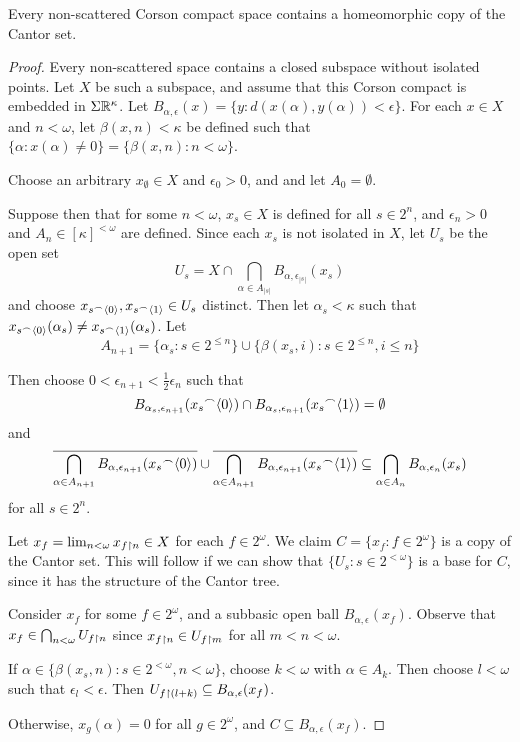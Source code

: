 \documentclass[11pt]{article}
\begin{document}
  \begin{lemma}
    Every non-scattered Corson compact space contains a homeomorphic
    copy of the Cantor set.
  \end{lemma}

  \begin{proof}
    Every non-scattered space contains a closed subspace without
    isolated points. Let $X$ be such a subspace, and assume that this
    Corson compact is embedded in $\Sigma\mathbb{R}^{\kappa}$. Let
    $B_{\alpha,\epsilon}(x)=\{y: d(x(\alpha),y(\alpha))<\epsilon\}$.
    For each $x\in X$ and $n<\omega$, let $\beta(x,n)<\kappa$ be defined
    such that
    $\{\alpha:x(\alpha)\not=0\}=\{\beta(x,n):n<\omega\}$.

    Choose an arbitrary $x_\emptyset\in X$ and $\epsilon_0>0$, and
    and let $A_0=\emptyset$.

    Suppose then that for some $n<\omega$,
    $x_s\in X$ is defined for all $s\in 2^n$,
    and $\epsilon_n>0$ and $A_n\in[\kappa]^{<\omega}$ are defined.
    Since each $x_s$ is not isolated in $X$, let $U_s$ be the open
    set
      \[
        U_s
          =
        X
          \cap
        \bigcap_{\alpha\in A_{|s|}} B_{\alpha,\epsilon_{|s|}}(x_s)
      \]
    and choose $x_{s{^\frown}\langle0\rangle},x_{s{^\frown}\langle1\rangle}\in U_s$ distinct.
    Then let $\alpha_s<\kappa$ such that
    $x_{s{^\frown}\langle0\rangle}(\alpha_s)\not=x_{s{^\frown}\langle1\rangle}(\alpha_s)$.
    Let
      \[
        A_{n+1}
          =
        \{\alpha_s:s\in2^{\leq n}\}
          \cup
        \{\beta(x_s,i):s\in2^{\leq n},i\leq n\}
      \]

    Then choose $0<\epsilon_{n+1}<\frac{1}{2}\epsilon_n$ such that
    \[
      B_{\alpha_s,\epsilon_{n+1}}(x_s{^\frown}\langle0\rangle)
        \cap
      B_{\alpha_s,\epsilon_{n+1}}(x_s{^\frown}\langle1\rangle)
        =
      \emptyset
    \]
    and
    \[
      \overline{
        \bigcap_{\alpha\in A_{n+1}}
        B_{\alpha,\epsilon_{n+1}}(x_s{^\frown}\langle0\rangle)
      }
        \cup
      \overline{
        \bigcap_{\alpha\in A_{n+1}}
        B_{\alpha,\epsilon_{n+1}}(x_s{^\frown}\langle1\rangle)
      }
        \subseteq
      \bigcap_{\alpha\in A_n} B_{\alpha,\epsilon_n}(x_s)
    \]
    for all $s\in 2^n$.

    Let $x_f=\lim_{n<\omega} x_{f\restriction n}\in X$
    for each $f\in 2^\omega$. We claim $C=\{x_f:f\in 2^\omega\}$
    is a copy of the Cantor set. This will follow if we can show that
    $\{U_s:s\in 2^{<\omega}\}$ is a base for $C$, since it has
    the structure of the Cantor tree.

    Consider $x_f$ for some $f\in 2^\omega$, and a subbasic open ball
    $B_{\alpha,\epsilon}(x_f)$. Observe that
    $x_f\in\bigcap_{n<\omega} U_{f\restriction n}$ since
    $x_{f\restriction n}\in U_{f\restriction m}$ for all $m<n<\omega$.

    If $\alpha\in\{\beta(x_s,n):s\in2^{<\omega},n<\omega\}$, choose
    $k<\omega$ with $\alpha\in A_k$. Then choose $l<\omega$ such that
    $\epsilon_l<\epsilon$. Then
    $U_{f\restriction(l+k)}\subseteq B_{\alpha,\epsilon}(x_f)$.

    Otherwise, $x_g(\alpha)=0$ for all $g\in2^\omega$, and
    $C\subseteq B_{\alpha,\epsilon}(x_f)$.
  \end{proof}
\end{document}

